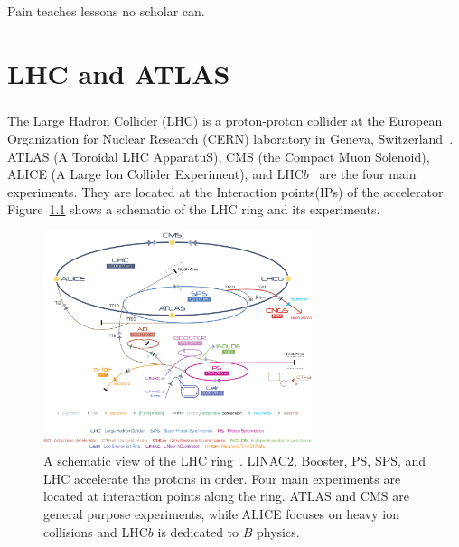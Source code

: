\begin{savequote}[75mm]
Pain teaches lessons no scholar can.
\end{savequote}

\chapter{LHC and ATLAS}
\paragraph{}
The Large Hadron Collider (LHC) is a proton-proton collider at the European Organization for Nuclear Research (CERN) laboratory in Geneva, Switzerland~\cite{LHCPaper}.  ATLAS (A Toroidal LHC ApparatuS), CMS (the Compact Muon Solenoid), ALICE (A Large Ion Collider Experiment), and LHC$b$~\cite{ATLASPaper, CMSPaper, LHCbPaper, ALICEPaper} are the four main experiments. They are located at the Interaction points(IPs) of the accelerator. Figure~\ref{fig:LHC} shows a schematic of the LHC ring and its experiments. 

\begin{figure}[h!]
  \centering
  \captionsetup{justification=centering}
  \includegraphics[width=0.7\textwidth]{figures/detector/Cern-Accelerator-Complex.jpg}
   \caption{A schematic view of the LHC ring~\cite{LHCReview}. LINAC2, Booster, PS, SPS, and LHC accelerate the protons in order. Four main experiments are located at interaction points along the ring. ATLAS and CMS are general purpose experiments, while ALICE focuses on heavy ion collisions and LHC$b$ is dedicated to $B$ physics.}
  \label{fig:LHC}
\end{figure}

